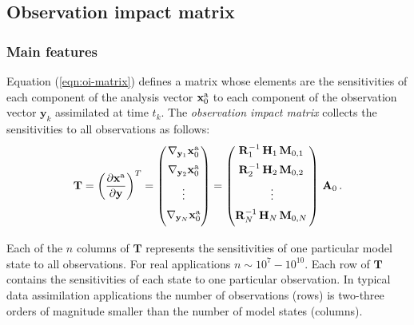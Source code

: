 \documentclass[final,sort&compress]{elsarticle}
\newcommand{\T}{\mathbf{T}}
\newcommand{\M}{\mathbf{M}}
\newcommand{\HH}{\mathbf H}
\newcommand{\A}{\mathbf{A}}
\newcommand{\R}{\mathbf{R}}
\newcommand{\xa}{ \mathbf{x}^{\rm a} }
\newcommand{\y}{ \mathbf{y} }
\begin{document}
\subsection{Observation impact matrix}\label{sec:obsimp}

\subsubsection{Main features}

Equation (\ref{eqn:oi-matrix}) defines a matrix whose elements are
the sensitivities of each component of the analysis vector $\xa_0$ to each component 
of the observation vector $\y_k$ assimilated at time $t_k$. 
The {\em observation impact matrix} collects the sensitivities to all observations as follows:
\begin{equation}
\label{eqn:oimatext}
\T
= 
\left(\frac{\partial \xa}{\partial \y}\right)^T
=
\begin{pmatrix}
 \nabla_{\y_1} \xa_0 \\[0.5em]
 \nabla_{\y_2} \xa_0 \\[0.5em]
 \vdots 	             \\[0.5em]
 \nabla_{\y_N} \xa_0 \\[0.5em]
\end{pmatrix}
=
\begin{pmatrix}
 \R_1^{-1}\, \HH_1\, \M_{0,1} \, \\[0.5em]
 \R_2^{-1}\, \HH_2\, \M_{0,2} \, \\[0.5em]
 \vdots   \\[0.5em]
 \R_N^{-1}\, \HH_N\, \M_{0,N} \, \\[0.5em]
\end{pmatrix}\,
\A_0\,. 
\end{equation}

Each of the $n$ columns of $\T$ represents the sensitivities of one particular model state to all observations. 
For real applications $n \sim 10^7 - 10^{10}$. 
Each row of $\T$ contains the sensitivities of each state to one particular observation.
In typical data assimilation applications the number of observations (rows) 
is two-three orders of magnitude smaller than the number of model states (columns). 
\end{document}
